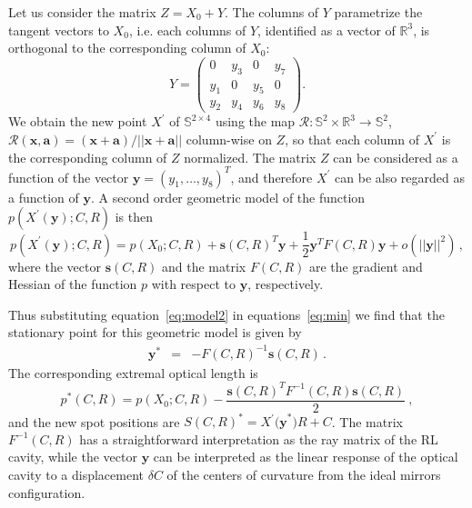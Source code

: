 \documentclass[12pt,a4paper,final]{iopart}
\begin{document}
Let us consider the matrix $Z=X_{0}+Y$. The columns of $Y$ parametrize the tangent vectors to $X_{0}$, i.e.
each columns of $Y$, identified as a vector of $\mathbb{R}^{3}$,
is orthogonal to the corresponding column of $X_{0}$: 
\begin{equation}
Y=\left(\begin{array}{cccc}
0 & y_{3} & 0 & y_{7} \nonumber \\
y_{1} & 0 & y_{5} & 0 \nonumber \\
y_{2} & y_{4} & y_{6} & y_{8} \nonumber
\end{array}\right).
\end{equation}
We obtain the new point $X^{'}$ of $\mathbb{S}^{2\times4}$ using
the map $\mathcal{R}:\mathbb{S}^{2}\times\mathbb{R}^{3}\rightarrow\mathbb{S}^{2}$,
$\mathcal{R}(\mathbf{x},\mathbf{a})=(\mathbf{x}+\mathbf{a})/||\mathbf{x}+\mathbf{a}||$
column-wise on $Z$, so that each column of $X^{'}$ is the corresponding column of $Z$ normalized. The matrix $Z$ can be considered as a function
of the vector $\mathbf{y}=(y_{1},\dots,y_{8})^{T}$, and
therefore $X^{'}$ can be also regarded as a function of $\mathbf{y}$. A second order 
geometric model of the function $p(X^{'}(\mathbf{y});C,R)$
is then
\begin{equation}
p(X^{'}(\mathbf{y});C,R)=p(X_{0};C,R)+\mathbf{s}(C,R)^{T}\mathbf{y} \label{eq:model2}+\frac{1}{2}\mathbf{y}^{T}F(C,R)\mathbf{y}+o(||\mathbf{y}||^{2})\,, 
\end{equation}
where the vector $\mathbf{s}(C,R)$ and the matrix $F(C,R)$ are the gradient 
and Hessian of the function $p$ with respect to $\mathbf{y}$, respectively. 

Thus substituting equation~\ref{eq:model2} in equations~\ref{eq:min}
we find that the stationary point for this geometric model is given by
\begin{eqnarray}
\mathbf{y}^{*} & = & -F(C,R)^{-1}\mathbf{s}(C,R)\,.\label{eq:y_sol}
\end{eqnarray}
The corresponding extremal optical length is 
\begin{equation}
p^{*}(C,R)=p(X_{0};C,R)-\frac{\mathbf{s}(C,R)^{T}F^{-1}(C,R)\mathbf{s}(C,R)}{2}\ , \label{eq:p(C)} \nonumber
\end{equation}
 and the new spot positions are $S(C,R)^{*}=X^{'}\mathbf{(y}^{*})R+C$.
The matrix $F^{-1}(C,R)$ has a straightforward interpretation as
the ray matrix of the RL cavity, while the vector $\mathbf{y}$ can
be interpreted as the linear response of the optical cavity to a displacement
$\delta C$ of the centers of curvature from the ideal mirrors configuration.\newline
\end{document}
